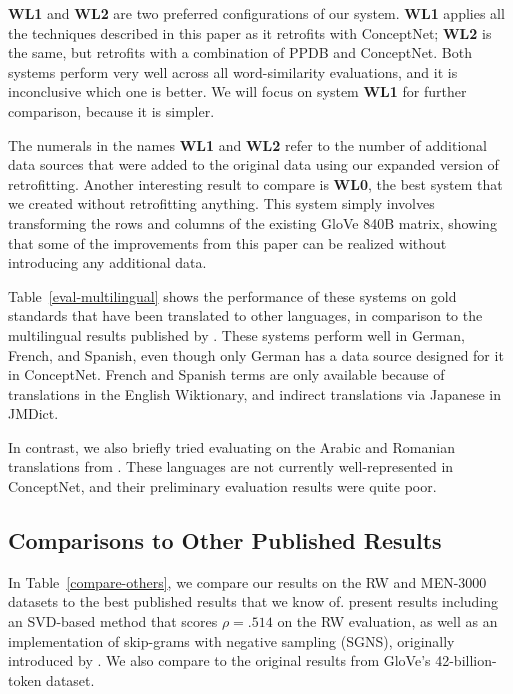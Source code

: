 \documentclass[letterpaper]{article}
\begin{document}
{\bf WL1} and {\bf WL2} are two preferred configurations of our system. {\bf WL1}
applies all the techniques described in this paper as it retrofits with
ConceptNet; {\bf WL2} is the same, but retrofits with a combination of PPDB and
ConceptNet. Both systems perform very well across all word-similarity
evaluations, and it is inconclusive which one is better. We will focus on
system {\bf WL1} for further comparison, because it is simpler.

The numerals in the names {\bf WL1} and {\bf WL2} refer to the number of
additional data sources that were added to the original data using our expanded
version of retrofitting. Another interesting result to compare is {\bf WL0},
the best system that we created without retrofitting anything. This system
simply involves transforming the rows and columns of the existing GloVe 840B
matrix, showing that some of the improvements from this paper can be realized
without introducing any additional data.

Table~\ref{eval-multilingual} shows the performance of these systems on
gold standards that have been translated to other languages, in comparison to
the multilingual results published by .
These systems perform well in German, French, and Spanish, even though only
German has a data source designed for it in ConceptNet. French and Spanish terms
are only available because of translations in the English Wiktionary, and
indirect translations via Japanese in JMDict.

In contrast, we also briefly tried evaluating on the Arabic and Romanian
translations from . These languages are not
currently well-represented in ConceptNet, and their preliminary evaluation
results were quite poor.

\subsection{Comparisons to Other Published Results}

In Table~\ref{compare-others}, we compare our results on the RW and MEN-3000
datasets to the best published results that we know of.
 present results including an SVD-based method
that scores $\rho = .514$ on the RW evaluation, as well as an implementation
of skip-grams with negative sampling (SGNS), originally introduced by
. We also compare to the original results from
GloVe's 42-billion-token dataset.
\end{document}
